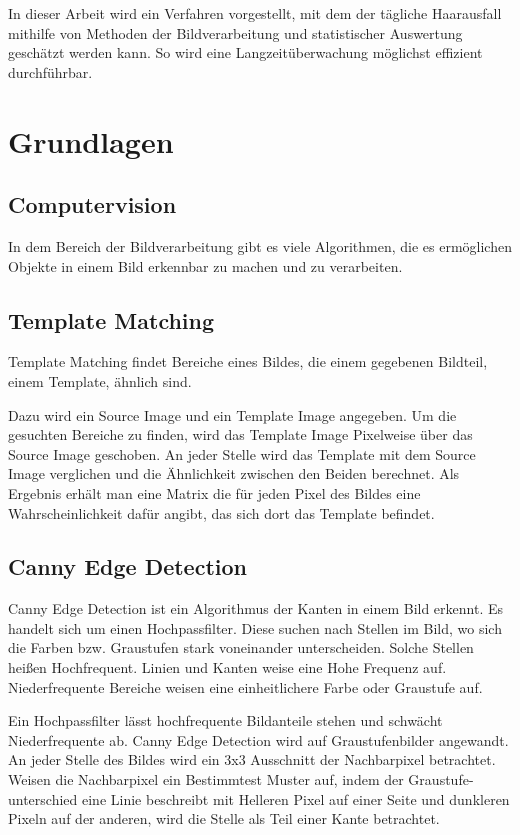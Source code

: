\documentclass[german,a4paper, 12pt]{llncs}
\begin{document}
In dieser Arbeit wird ein Verfahren vorgestellt, mit dem der tägliche Haarausfall mithilfe von Methoden der Bildverarbeitung und statistischer Auswertung geschätzt werden kann. So wird eine Langzeitüberwachung möglichst effizient durchführbar.
\section{Grundlagen}
\subsection{Computervision}
In dem Bereich der Bildverarbeitung gibt es viele Algorithmen, die es ermöglichen Objekte in einem Bild erkennbar zu machen und zu verarbeiten.

\subsection{Template Matching} 

Template Matching findet Bereiche eines Bildes, die einem gegebenen Bildteil, einem Template, ähnlich sind.

Dazu wird ein Source Image und ein Template Image angegeben. Um die gesuchten Bereiche zu finden, wird das Template Image Pixelweise über das Source Image geschoben. An jeder Stelle wird das Template mit dem Source Image verglichen und die Ähnlichkeit zwischen den Beiden berechnet. Als Ergebnis erhält man eine Matrix die für jeden Pixel des Bildes eine Wahrscheinlichkeit dafür angibt, das sich dort das Template befindet.\cite{TemplateMatchingCV}

\subsection{Canny Edge Detection}
Canny Edge Detection ist ein Algorithmus der Kanten in einem Bild erkennt. 
Es handelt sich um einen Hochpassfilter. Diese suchen nach Stellen im Bild, wo sich die Farben bzw. Graustufen stark voneinander unterscheiden. Solche Stellen heißen Hochfrequent. Linien und Kanten weise eine Hohe Frequenz auf. Niederfrequente Bereiche weisen eine einheitlichere Farbe oder Graustufe auf.\cite{Canny}

Ein Hochpassfilter lässt hochfrequente Bildanteile stehen und schwächt Niederfrequente ab. 
Canny Edge Detection wird auf Graustufenbilder angewandt. An jeder Stelle des Bildes wird ein 3x3 Ausschnitt der Nachbarpixel betrachtet. Weisen die Nachbarpixel ein Bestimmtest Muster auf, indem der Graustufe-unterschied eine Linie beschreibt mit Helleren Pixel auf einer Seite und dunkleren Pixeln auf der anderen, wird die Stelle als Teil einer Kante betrachtet.\cite{Canny}
\end{document}
